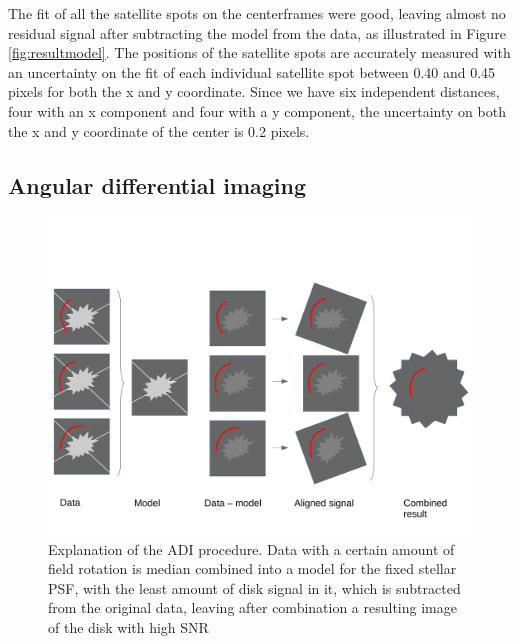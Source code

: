 \documentclass[twoside,single,12pt]{lion-msc}
\begin{document}
The fit of all the satellite spots on the centerframes were good, leaving almost no residual signal after subtracting the model from the data, as illustrated in Figure \ref{fig:resultmodel}. The positions of the satellite spots are accurately measured with an uncertainty on the fit of each individual satellite spot between 0.40 and 0.45 pixels for both the x and y coordinate. Since we have six independent distances, four with an x component and four with a y component, the uncertainty on both the x and y coordinate of the center is 0.2 pixels.

\subsection{Angular differential imaging}
\begin{figure}[!b]
\centering 
\includegraphics[trim={0cm 1cm 0cm 4cm},clip,width = \textwidth]{adiexplanation}
\caption{Explanation of the ADI procedure. Data with a certain amount of field rotation is median combined into a model for the fixed stellar PSF, with the least amount of disk signal in it, which is subtracted from the original data, leaving after combination a resulting image of the disk with high SNR} 
\label{fig:adiexplanation}
\end{figure}
\end{document}

